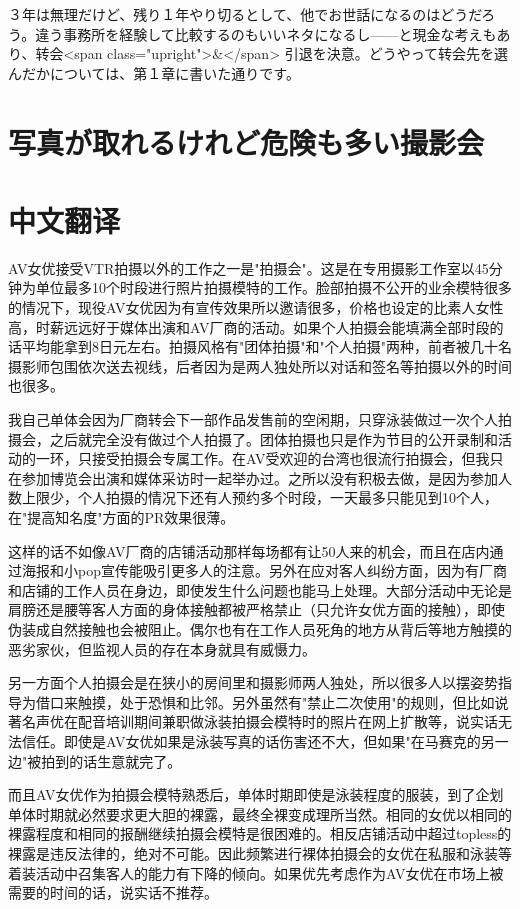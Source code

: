 \documentclass[12pt,UTF8]{ctexbook}
\begin{document}
３年は無理だけど、残り１年やり切るとして、他でお世話になるのはどうだろう。違う事務所を経験して比較するのもいいネタになるし——と現金な考えもあり、转会<span class="upright">\&</span> 引退を決意。どうやって转会先を選んだかについては、第１章に書いた通りです。

\switchcolumn

\section{写真が取れるけれど危険も多い撮影会}

\switchcolumn

\section*{中文翻译}

AV女优接受VTR拍摄以外的工作之一是"拍摄会"。这是在专用摄影工作室以45分钟为单位最多10个时段进行照片拍摄模特的工作。脸部拍摄不公开的业余模特很多的情况下，现役AV女优因为有宣传效果所以邀请很多，价格也设定的比素人女性高，时薪远远好于媒体出演和AV厂商的活动。如果个人拍摄会能填满全部时段的话平均能拿到8日元左右。拍摄风格有"团体拍摄"和"个人拍摄"两种，前者被几十名摄影师包围依次送去视线，后者因为是两人独处所以对话和签名等拍摄以外的时间也很多。

我自己单体会因为厂商转会下一部作品发售前的空闲期，只穿泳装做过一次个人拍摄会，之后就完全没有做过个人拍摄了。团体拍摄也只是作为节目的公开录制和活动的一环，只接受拍摄会专属工作。在AV受欢迎的台湾也很流行拍摄会，但我只在参加博览会出演和媒体采访时一起举办过。之所以没有积极去做，是因为参加人数上限少，个人拍摄的情况下还有人预约多个时段，一天最多只能见到10个人，在"提高知名度"方面的PR效果很薄。

这样的话不如像AV厂商的店铺活动那样每场都有让50人来的机会，而且在店内通过海报和小pop宣传能吸引更多人的注意。另外在应对客人纠纷方面，因为有厂商和店铺的工作人员在身边，即使发生什么问题也能马上处理。大部分活动中无论是肩膀还是腰等客人方面的身体接触都被严格禁止（只允许女优方面的接触），即使伪装成自然接触也会被阻止。偶尔也有在工作人员死角的地方从背后等地方触摸的恶劣家伙，但监视人员的存在本身就具有威慑力。

另一方面个人拍摄会是在狭小的房间里和摄影师两人独处，所以很多人以摆姿势指导为借口来触摸，处于恐惧和比邻。另外虽然有"禁止二次使用"的规则，但比如说著名声优在配音培训期间兼职做泳装拍摄会模特时的照片在网上扩散等，说实话无法信任。即使是AV女优如果是泳装写真的话伤害还不大，但如果"在马赛克的另一边"被拍到的话生意就完了。

而且AV女优作为拍摄会模特熟悉后，单体时期即使是泳装程度的服装，到了企划单体时期就必然要求更大胆的裸露，最终全裸变成理所当然。相同的女优以相同的裸露程度和相同的报酬继续拍摄会模特是很困难的。相反店铺活动中超过topless的裸露是违反法律的，绝对不可能。因此频繁进行裸体拍摄会的女优在私服和泳装等着装活动中召集客人的能力有下降的倾向。如果优先考虑作为AV女优在市场上被需要的时间的话，说实话不推荐。
\end{document}
